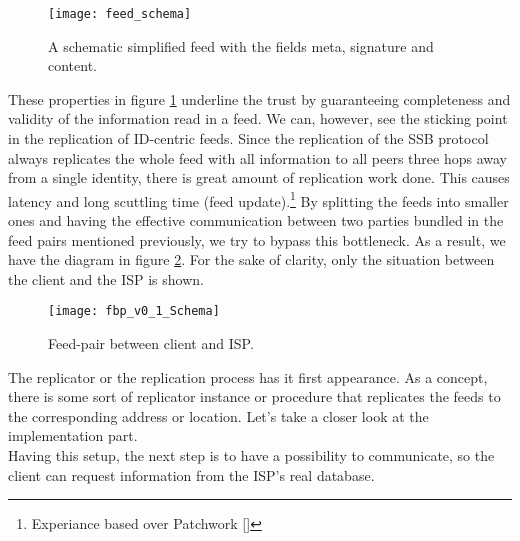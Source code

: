 \begin{figure}
    \centering
    \texttt{[image: feed\_schema]}
    \caption{A schematic simplified feed with the fields meta, signature and content.}
    \label{fig:feed_schema}
\end{figure}

These properties in figure \ref{fig:feed_schema} underline the trust by guaranteeing completeness and validity of the information read in a feed. We can, however, see the sticking point in the replication of ID-centric feeds. Since the replication of the SSB protocol always replicates the whole feed with all information to all peers three hops away from a single identity, there is great amount of replication work done. This causes latency and long scuttling time (feed update).\footnote{Experiance based over Patchwork []} By splitting the feeds into smaller ones and having the effective communication between two parties bundled in the feed pairs mentioned previously, we try to bypass this bottleneck. As a result, we have the diagram in figure \ref{fig:contract_cli_isp}. For the sake of clarity, only the situation between the client and the ISP is shown. 

\begin{figure}
    \centering
    \texttt{[image: fbp\_v0\_1\_Schema]}
    \caption{Feed-pair between client and ISP.}
    \label{fig:contract_cli_isp}
\end{figure}
The replicator or the replication process has it first appearance. As a concept, there is some sort of replicator instance or procedure that replicates the feeds to the corresponding address or location. Let's take a closer look at the implementation part. \\
Having this setup, the next step is to have a possibility to communicate, so the client can request information from the ISP’s real database.
\enlargethispage{\baselineskip}
\pagebreak
